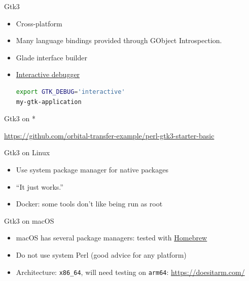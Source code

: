 \begin{frame}[fragile]{Gtk3}
	\begin{itemize}[<+->]
		\item Cross-platform
		\item Many language bindings provided through GObject Introspection.
		\item Glade interface builder
		\item \href{https://developer.gnome.org/gtk3/stable/gtk-running.html}{Interactive debugger}
{
\begin{block}{}
\begin{lstlisting}[language=sh,xleftmargin=10pt]
export GTK_DEBUG='interactive'
my-gtk-application
\end{lstlisting}
\end{block}
}
	\end{itemize}
\end{frame}

\begin{frame}{Gtk3 on *}
\begin{center}

\url{https://github.com/orbital-transfer-example/perl-gtk3-starter-basic}
\end{center}
\end{frame}

\begin{frame}[fragile]{Gtk3 on Linux}
	\begin{itemize}[<+->]
		\item Use system package manager for native packages
		\item ``It just works.'' \uncover<+->{ --- me (ca. just now) }
		\item Docker: some tools don't like being run as root
	\end{itemize}
\end{frame}

\begin{frame}[fragile]{Gtk3 on macOS}
	\begin{itemize}[<+->]
		\item macOS has several package managers: tested with \href{https://brew.sh/}{Homebrew}
		\item Do not use system Perl (good advice for any platform)
		\item Architecture: \texttt{x86\_64}, will need testing on \texttt{arm64}: \url{https://doesitarm.com/}
	\end{itemize}
\end{frame}

